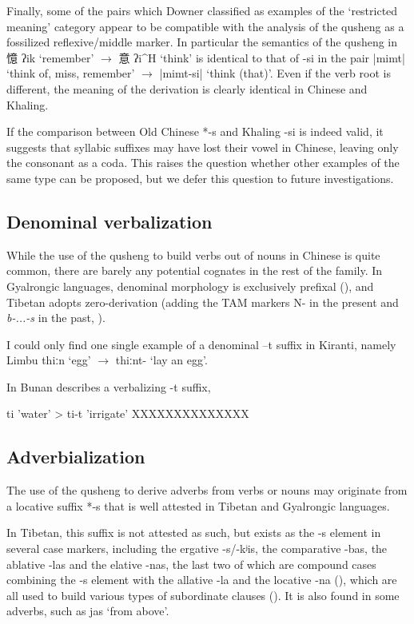 \documentclass[oldfontcommands,oneside,a4paper,11pt]{article}
\newcommand{\ipa}[1]{{\phon \mbox{#1}}} %
\newcommand{\zh}[1]{{\cn #1}}
\newcommand{\ch}[3]{\zh{#1} \ipa{#2} `#3'}
\begin{document}
Finally, some of the pairs which Downer classified as examples of the `restricted meaning' category appear to be compatible with the analysis of the qusheng as a fossilized reflexive/middle marker. In particular the semantics of the qusheng in \ch{憶}{ʔik}{remember} $\rightarrow$ \ch{意}{ʔi^H}{think} is identical to that of \ipa{-si} in the pair \ipa{|mimt|} `think of, miss, remember' $\rightarrow$ \ipa{|mimt-si|} `think (that)'. Even if the verb root is different, the meaning of the derivation is clearly identical in Chinese and Khaling.

If the comparison between Old Chinese *\ipa{-s} and Khaling \ipa{-si} is indeed valid, it suggests that syllabic suffixes may have lost their vowel in Chinese, leaving only the consonant as a coda. This raises the question whether other examples of the same type can be proposed, but we defer this question to future investigations.
 
\subsection{Denominal verbalization}
While the use of the qusheng to build verbs out of nouns in Chinese is quite common, there are barely any potential cognates in the rest of the family. In Gyalrongic languages, denominal morphology is exclusively prefixal (\citealt{jacques14antipassive}), and Tibetan adopts zero-derivation (adding the TAM markers N- in the present and \textit{b-...-s} in the past, \citealt[29]{jacques14tangoute}). 

I could only find one single example of a denominal \ipa{--t}  suffix in Kiranti, namely Limbu \ipa{thiːn} `egg' $\rightarrow$ \ipa{thiːnt-} `lay an egg'.  

In Bunan \citet[426]{widmer14bunan} describes a verbalizing -t suffix, 

ti 'water'  > ti-t 'irrigate'
XXXXXXXXXXXXXX

\subsection{Adverbialization}
The use of the qusheng  to derive adverbs from verbs or nouns may originate from a locative suffix *\ipa{-s} that is well attested in Tibetan and Gyalrongic languages.

In Tibetan, this suffix is not attested as such, but exists as the \ipa{-s} element in several case markers, including the ergative \ipa{-s}/\ipa{-kʲis}, the comparative \ipa{-bas}, the ablative \ipa{-las} and the elative \ipa{-nas}, the last two of which are compound cases combining the \ipa{-s} element with the allative \ipa{-la} and the locative \ipa{-na} (\citealt{hill12bas}), which are all used to build various types of subordinate clauses (\citealt{tournadre10cases}). It is also found in some adverbs, such as \ipa{jas} `from above'. 
\end{document}
